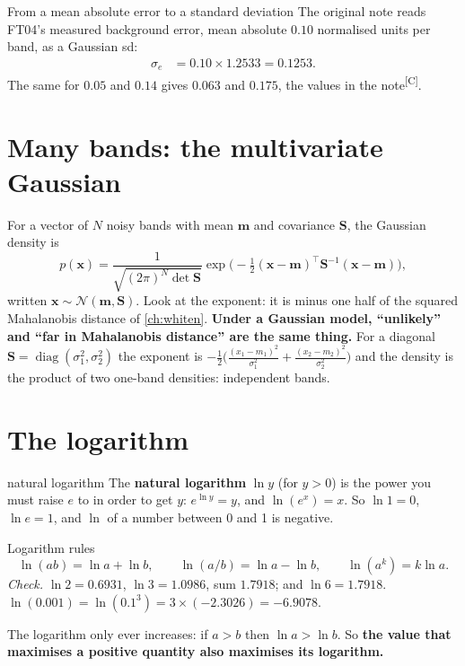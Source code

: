 \documentclass[11pt,a4paper,oneside,openany]{book}
\newcommand{\B}[1]{{\symbf{#1}}}
\newcommand{\B}[1]{{\bm{#1}}}
\newcommand{\comp}{\textsuperscript{\textsf{\scriptsize[C]}}}
\newcommand{\T}{^{\top}}
\newcommand{\vx}{\B{x}}
\newcommand{\vm}{\B{m}}
\newcommand{\mS}{\B{S}}
\begin{document}
\begin{worked}[label=we:meanabs]{From a mean absolute error to a standard deviation}
The original note reads FT04's measured background error, mean absolute $0.10$ normalised units per band, as a Gaussian sd:
\begin{align*}
\sigma_e &= 0.10\times1.2533=0.1253 .
\end{align*}
The same for $0.05$ and $0.14$ gives $0.063$ and $0.175$, the values in the note\comp.
\end{worked}

\section{Many bands: the multivariate Gaussian}

For a vector of $N$ noisy bands with mean $\vm$ and covariance $\mS$, the Gaussian density is
\[
  p(\vx)=\frac{1}{\sqrt{(2\pi)^N\det\mS}}\exp\!\Big(-\tfrac12(\vx-\vm)\T\mS^{-1}(\vx-\vm)\Big),
\]
written $\vx\sim\mathcal N(\vm,\mS)$. Look at the exponent: it is minus one half of the squared Mahalanobis distance of
\cref{ch:whiten}. \textbf{Under a Gaussian model, ``unlikely'' and ``far in Mahalanobis distance'' are the same thing.} For a
diagonal $\mS=\operatorname{diag}(\sigma_1^2,\sigma_2^2)$ the exponent is $-\frac12\big(\frac{(x_1-m_1)^2}{\sigma_1^2}+\frac{(x_2-m_2)^2}{\sigma_2^2}\big)$ and
the density is the product of two one-band densities: independent bands.

\section{The logarithm}

\begin{defn}{natural logarithm}
The \textbf{natural logarithm} $\ln y$ (for $y>0$) is the power you must raise $e$ to in order to get $y$: $e^{\ln y}=y$, and
$\ln(e^x)=x$. So $\ln1=0$, $\ln e=1$, and $\ln$ of a number between 0 and 1 is negative.
\end{defn}

\begin{rulebox}[label=rule:log]{Logarithm rules}
\[
  \ln(ab)=\ln a+\ln b,\qquad \ln(a/b)=\ln a-\ln b,\qquad \ln(a^k)=k\ln a .
\]
\emph{Check.} $\ln2=0.6931$, $\ln3=1.0986$, sum $1.7918$; and $\ln6=1.7918$. $\ln(0.001)=\ln(0.1^3)=3\times(-2.3026)=-6.9078$.

The logarithm only ever increases: if $a>b$ then $\ln a>\ln b$. So \textbf{the value that maximises a positive quantity also
maximises its logarithm.}
\end{rulebox}
\end{document}
